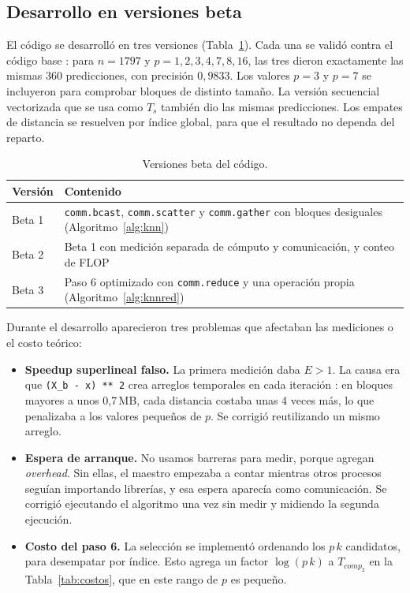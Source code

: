 \documentclass[11pt,a4paper]{article}
\newcommand{\tcomp}[1]{T_{comp_{#1}}}
\begin{document}
\subsection{Desarrollo en versiones beta}
\label{sec:betas}
El código se desarrolló en tres versiones (Tabla~\ref{tab:betas}). Cada una se validó contra el código base \cite{base}: para $n=1797$ y $p=1,2,3,4,7,8,16$, las tres dieron exactamente las mismas 360 predicciones, con precisión $0{,}9833$. Los valores $p=3$ y $p=7$ se incluyeron para comprobar bloques de distinto tamaño. La versión secuencial vectorizada que se usa como $T_s$ también dio las mismas predicciones. Los empates de distancia se resuelven por índice global, para que el resultado no dependa del reparto.

\begin{table}[ht]
\centering\small
\begin{tabularx}{\linewidth}{lX}
  \toprule
  \textbf{Versión} & \textbf{Contenido} \\
  \midrule
  Beta 1 & \texttt{comm.bcast}, \texttt{comm.scatter} y \texttt{comm.gather} con bloques desiguales (Algoritmo~\ref{alg:knn}) \\
  Beta 2 & Beta 1 con medición separada de cómputo y comunicación, y conteo de FLOP \\
  Beta 3 & Paso 6 optimizado con \texttt{comm.reduce} y una operación propia (Algoritmo~\ref{alg:knnred}) \\
  \bottomrule
\end{tabularx}
\caption{Versiones beta del código.}
\label{tab:betas}
\end{table}

Durante el desarrollo aparecieron tres problemas que afectaban las mediciones o el costo teórico:
\begin{itemize}
  \item \textbf{Speedup superlineal falso.} La primera medición daba $E>1$. La causa era que \texttt{(X\_b - x) ** 2} crea arreglos temporales en cada iteración \cite{numpy}: en bloques mayores a unos 0,7\,MB, cada distancia costaba unas 4 veces más, lo que penalizaba a los valores pequeños de $p$. Se corrigió reutilizando un mismo arreglo.
  \item \textbf{Espera de arranque.} No usamos barreras para medir, porque agregan \textit{overhead}. Sin ellas, el maestro empezaba a contar mientras otros procesos seguían importando librerías, y esa espera aparecía como comunicación. Se corrigió ejecutando el algoritmo una vez sin medir y midiendo la segunda ejecución.
  \item \textbf{Costo del paso 6.} La selección se implementó ordenando los $p\,k$ candidatos, para desempatar por índice. Esto agrega un factor $\log(p\,k)$ a $\tcomp{2}$ en la Tabla~\ref{tab:costos}, que en este rango de $p$ es pequeño.
\end{itemize}
\end{document}
